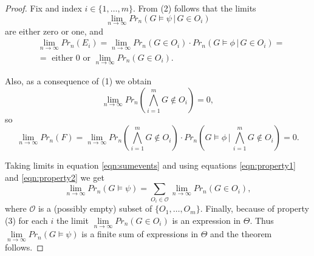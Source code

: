 \documentclass[11pt,notitlepage]{report}
\theoremstyle{definition}
\newcommand{\Ln}{\lim\limits_{n\to \infty}}
\begin{document}
\begin{proof}
Fix and index $i\in \{1, \dots, m\}$. From (2) follows that 
the limits 
\[ \Ln Pr_n(G\models \psi \, | \, G\in O_i )\] 
are either zero or one, and 
\begin{align}\label{eqn:property1}
&\Ln Pr_n(E_i)= \Ln Pr_n(G\in O_i)\cdot Pr_n(G\models \phi \, | \, G\in O_i)=\\ 
&
\nonumber
= \text{ either } 0 \text{ or } \Ln Pr_n(G\in O_i).
\end{align} 
\par 
Also, as a consequence of (1) we obtain
\[\Ln Pr_n(\bigwedge_{i=1}^{m} G \notin O_i)=0, \] 
so
\begin{equation}\label{eqn:property2}
\Ln Pr_n(F)= \Ln Pr_n(\bigwedge_{i=1}^{m} G \notin O_i)\cdot 
Pr_n(G\models \phi \, | \, \bigwedge_{i=1}^{m} G \notin O_i)=0.  
\end{equation}
\par
Taking limits in equation \ref{eqn:sumevents} and using equations \ref{eqn:property1} and \ref{eqn:property2} 
we get
\[ \Ln Pr_n(G\models \psi) = \sum\limits_{O_i\in \mathcal{O}} \Ln
Pr_n(G \in O_i) ,\]
where $\mathcal{O}$ is a (possibly empty) subset of $\{O_1,\dots, O_{m}\}$.
Finally, because of property (3) for each $i$ the limit $\Ln Pr_n(G \in O_i)$ is 
an expression in $\Theta$. Thus $\Ln Pr_n(G\models \psi)$ is a finite sum of expressions in $\Theta$ and the theorem follows.
\end{proof}



\end{document}
